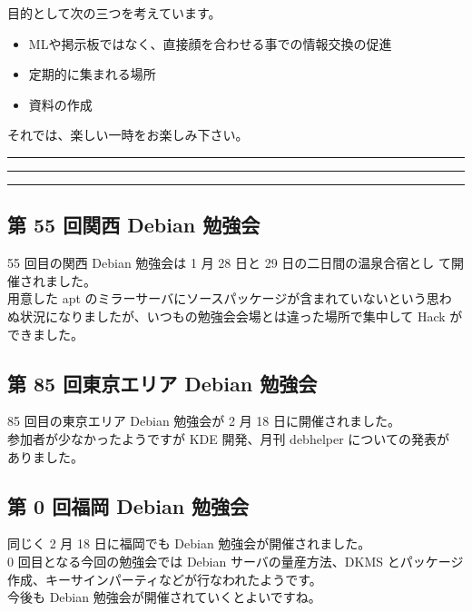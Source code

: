 \documentclass[mingoth,a4paper]{jsarticle}
\begin{document}
 目的として次の三つを考えています。
 \begin{itemize}
  \item MLや掲示板ではなく、直接顔を合わせる事での情報交換の促進
  \item 定期的に集まれる場所
  \item 資料の作成
 \end{itemize}

 それでは、楽しい一時をお楽しみ下さい。

\newpage

\begin{minipage}[b]{0.2\hsize}
 {}
\end{minipage}
\begin{minipage}[b]{0.8\hsize}
\hrule
\vspace{2mm}
\hrule
\setcounter{tocdepth}{1}
\tableofcontents
\vspace{2mm}
\hrule
\end{minipage}


\subsection{第 55 回関西 Debian 勉強会}
55 回目の関西 Debian 勉強会は 1 月 28 日と 29 日の二日間の温泉合宿とし
て開催されました。\\
用意した apt のミラーサーバにソースパッケージが含まれていないという思わ
ぬ状況になりましたが、いつもの勉強会会場とは違った場所で集中して Hack
ができました。

\subsection{第 85 回東京エリア Debian 勉強会}
85 回目の東京エリア Debian 勉強会が 2 月 18 日に開催されました。\\
参加者が少なかったようですが KDE 開発、月刊 debhelper についての発表が
ありました。

\subsection{第 0 回福岡 Debian 勉強会}
同じく 2 月 18 日に福岡でも Debian 勉強会が開催されました。\\
0 回目となる今回の勉強会では Debian サーバの量産方法、DKMS とパッケージ
作成、キーサインパーティなどが行なわれたようです。\\
今後も Debian 勉強会が開催されていくとよいですね。
\end{document}
